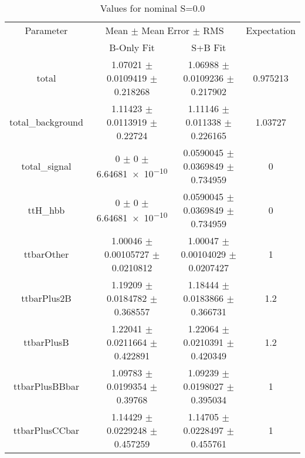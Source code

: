 \begin{table}
\centering
\caption{Values for nominal S=0.0}
\begin{tabular}{cccc}
\toprule
Parameter & \multicolumn{2}{c}{Mean $\pm$ Mean Error $\pm$ RMS} & Expectation\\
 & B-Only Fit & S+B Fit & \\
\midrule
total & \num{1.07021} $\pm$ \num{0.0109419} $\pm$ \num{0.218268} & \num{1.06988} $\pm$ \num{0.0109236} $\pm$ \num{0.217902} & \num{0.975213}\\
total\_background & \num{1.11423} $\pm$ \num{0.0113919} $\pm$ \num{0.22724} & \num{1.11146} $\pm$ \num{0.011338} $\pm$ \num{0.226165} & \num{1.03727}\\
total\_signal & \num{0} $\pm$ \num{0} $\pm$ \num{6.64681e-10} & \num{0.0590045} $\pm$ \num{0.0369849} $\pm$ \num{0.734959} & \num{0}\\
ttH\_hbb & \num{0} $\pm$ \num{0} $\pm$ \num{6.64681e-10} & \num{0.0590045} $\pm$ \num{0.0369849} $\pm$ \num{0.734959} & \num{0}\\
ttbarOther & \num{1.00046} $\pm$ \num{0.00105727} $\pm$ \num{0.0210812} & \num{1.00047} $\pm$ \num{0.00104029} $\pm$ \num{0.0207427} & \num{1}\\
ttbarPlus2B & \num{1.19209} $\pm$ \num{0.0184782} $\pm$ \num{0.368557} & \num{1.18444} $\pm$ \num{0.0183866} $\pm$ \num{0.366731} & \num{1.2}\\
ttbarPlusB & \num{1.22041} $\pm$ \num{0.0211664} $\pm$ \num{0.422891} & \num{1.22064} $\pm$ \num{0.0210391} $\pm$ \num{0.420349} & \num{1.2}\\
ttbarPlusBBbar & \num{1.09783} $\pm$ \num{0.0199354} $\pm$ \num{0.39768} & \num{1.09239} $\pm$ \num{0.0198027} $\pm$ \num{0.395034} & \num{1}\\
ttbarPlusCCbar & \num{1.14429} $\pm$ \num{0.0229248} $\pm$ \num{0.457259} & \num{1.14705} $\pm$ \num{0.0228497} $\pm$ \num{0.455761} & \num{1}\\
\bottomrule
\end{tabular}
\end{table}